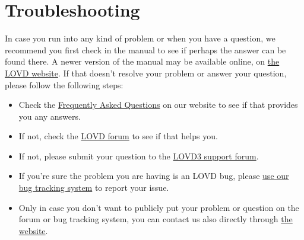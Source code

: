 \documentclass[a4paper,oneside,openany,12pt]{memoir}
\begin{document}
\clearpage %










\hypertarget{chap:troubleshooting}{}
\chapter{Troubleshooting}
In case you run into any kind of problem or when you have a question, we recommend you first check in the manual to see if perhaps the answer can be found there.
A newer version of the manual may be available online, on \href{http://www.lovd.nl/3.0/docs/}{the LOVD website}.
If that doesn't resolve your problem or answer your question, please follow the following steps:
\begin{itemize}
  \item Check the \href{http://www.lovd.nl/3.0/faq}{Frequently Asked Questions} on our website to see if that provides you any answers.
  \item If not, check the \href{https://humgenprojects.lumc.nl/trac/LOVD3/discussion}{LOVD forum} to see if that helps you.
  \item If not, please submit your question to the \href{https://humgenprojects.lumc.nl/trac/LOVD3/discussion/forum/1}{LOVD3 support forum}.
  \item If you're sure the problem you are having is an LOVD bug, please \href{https://humgenprojects.lumc.nl/trac/LOVD3/report/1}{use our bug tracking system} to report your issue.
  \item Only in case you don't want to publicly put your problem or question on the forum or bug tracking system, you can contact us also directly through \href{http://www.lovd.nl/3.0/contact}{the website}.
\end{itemize}
\end{document}
